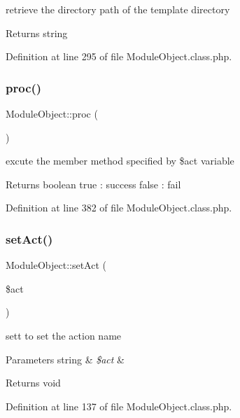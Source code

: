 retrieve the directory path of the template directory \begin{DoxyReturn}{Returns}
string 
\end{DoxyReturn}


Definition at line 295 of file Module\+Object.\+class.\+php.

\hypertarget{classModuleObject_a621ea29505c6ccd4444a06bc1c8554a5}{}\label{classModuleObject_a621ea29505c6ccd4444a06bc1c8554a5} 
\subsubsection{\texorpdfstring{proc()}{proc()}}
{\footnotesize\ttfamily Module\+Object\+::proc (\begin{DoxyParamCaption}{ }\end{DoxyParamCaption})}

excute the member method specified by \$act variable \begin{DoxyReturn}{Returns}
boolean true \+: success false \+: fail 
\end{DoxyReturn}


Definition at line 382 of file Module\+Object.\+class.\+php.

\hypertarget{classModuleObject_a35d0b9120ea393d4b4177b0c667e198c}{}\label{classModuleObject_a35d0b9120ea393d4b4177b0c667e198c} 
\subsubsection{\texorpdfstring{set\+Act()}{setAct()}}
{\footnotesize\ttfamily Module\+Object\+::set\+Act (\begin{DoxyParamCaption}\item[{}]{\$act }\end{DoxyParamCaption})}

sett to set the action name 
\begin{DoxyParams}[1]{Parameters}
string & {\em \$act} & \\
\hline
\end{DoxyParams}
\begin{DoxyReturn}{Returns}
void 
\end{DoxyReturn}


Definition at line 137 of file Module\+Object.\+class.\+php.


